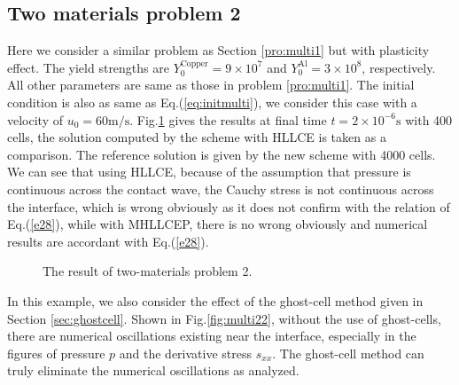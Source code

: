 \documentclass[review]{elsarticle}
\begin{document}
\subsection{Two materials problem 2}
Here we consider a similar problem as Section \ref{pro:multi1} but with plasticity effect. The yield strengths are $Y_0^{\text{Copper}} = 9\times 10^7$ and $Y_0^{\text{Al}} = 3\times 10^8$, respectively. All other  parameters are same as those in problem \ref{pro:multi1}. The initial condition is also as  same as  Eq.(\ref{eq:initmulti}), we consider this case with a velocity of $u_0 = 60 \text{m}/\text{s}$.
Fig.\ref{fig:multi2} gives the results at final time $ t= 2 \times 10^{-6} \text{s}$ with 400 cells, the solution computed by the scheme with HLLCE is taken as a comparison. The reference solution is given by the new scheme with 4000 cells. We can see that using HLLCE, because of the assumption that pressure is continuous across the contact wave, the Cauchy stress is not continuous across the interface, which is wrong obviously as it does not confirm with the relation of Eq.(\ref{e28}), while with MHLLCEP, there is no wrong obviously and numerical results are accordant with Eq.(\ref{e28}).
\begin{figure}

	  \caption{The result of two-materials  problem 2.}
      \label{fig:multi2}
    \end{figure}

	In this example, we also consider the effect of the ghost-cell method given in Section \ref{sec:ghostcell}. Shown in Fig.\ref{fig:multi22}, without the use of  ghost-cells, there are  numerical oscillations existing near the interface, especially in  the figures of pressure $p$ and the derivative stress $s_{xx}$.  The ghost-cell method can truly eliminate the  numerical oscillations as analyzed.
\end{document}
